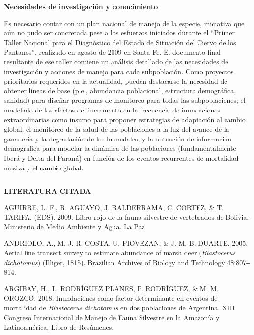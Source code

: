 \documentclass[
  x11names]{article}
\begin{document}
\textbf{Necesidades de investigación y conocimiento}

Es necesario contar con un plan nacional de manejo de la especie,
iniciativa que aún no pudo ser concretada pese a los esfuerzos iniciados
durante el ``Primer Taller Nacional para el Diagnóstico del Estado de
Situación del Ciervo de los Pantanos'', realizado en agosto de 2009 en
Santa Fe. El documento final resultante de ese taller contiene un
análisis detallado de las necesidades de investigación y acciones de
manejo para cada subpoblación. Como proyectos prioritarios requeridos en
la actualidad, pueden destacarse la necesidad de obtener líneas de base
(p.e., abundancia poblacional, estructura demográfica, sanidad) para
diseñar programas de monitoreo para todas las subpoblaciones; el
modelado de los efectos del incremento en la frecuencia de inundaciones
extraordinarias como insumo para proponer estrategias de adaptación al
cambio global; el monitoreo de la salud de las poblaciones a la luz del
avance de la ganadería y la degradación de los humedales; y la obtención
de información demográfica para modelar la dinámica de las poblaciones
(fundamentalmente Iberá y Delta del Paraná) en función de los eventos
recurrentes de mortalidad masiva y el cambio global.

%
\begin{table}[H]
\centering
\begin{tabular}[t]{>{\raggedright\arraybackslash}m{16cm}>{}m{16cm}}
\toprule
\cellcolor{ceil}{\textcolor{white}{\textbf{\rule{0pt}{14pt}BIBLIOGRAFÍA}}}\\
\bottomrule
\end{tabular}
\end{table}

\setlength{\parindent}{20pt}\noindent\textbf{LITERATURA CITADA}

AGUIRRE, L. F., R. AGUAYO, J. BALDERRAMA, C. CORTEZ, \& T. TARIFA.
(EDS). 2009. Libro rojo de la fauna silvestre de vertebrados de Bolivia.
Ministerio de Medio Ambiente y Agua. La Paz

ANDRIOLO, A., M. J. R. COSTA, U. PIOVEZAN, \& J. M. B. DUARTE. 2005.
Aerial line transect survey to estimate abundance of marsh deer
(\textit{Blastocerus} \textit{dichotomus}) (Illiger, 1815). Brazilian
Archives of Biology and Technology 48:807‒814.

ARGIBAY, H., L. RODRÍGUEZ PLANES, P. RODRÍGUEZ, \& M. M. OROZCO. 2018.
Inundaciones como factor determinante en eventos de mortalidad de
\textit{Blastocerus} \textit{dichotomus} en dos poblaciones de
Argentina. XIII Congreso Internacional de Manejo de Fauna Silvestre en
la Amazonía y Latinoamérica, Libro de Resúmenes.
\end{document}
